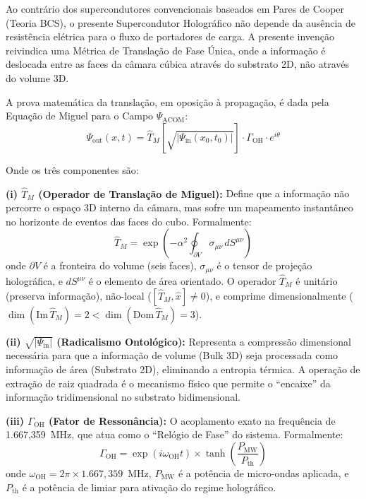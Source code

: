 \documentclass[12pt,a4paper]{article}
\newcommand{\alphaii}{\alpha^2}
\newcommand{\TM}{\hat{T}_M}
\newcommand{\GOH}{\Gamma_{\text{OH}}}
\begin{document}
Ao contrário dos supercondutores convencionais baseados em
Pares de Cooper (Teoria BCS), o presente Supercondutor
Holográfico não depende da ausência de resistência elétrica
para o fluxo de portadores de carga. A presente invenção
reivindica uma Métrica de Translação de Fase Única, onde a
informação é deslocada entre as faces da câmara cúbica através
do substrato 2D, não através do volume 3D.

A prova matemática da translação, em oposição à propagação, é
dada pela Equação de Miguel para o Campo $\Psi_{\text{ACOM}}$:
\begin{equation}
\Psi_{\text{out}}(x,t) = \TM\left[\sqrt{|\Psi_{\text{in}}
  (x_0,t_0)|}\right] \cdot \GOH \cdot e^{i\theta}
\label{eq:miguel}
\end{equation}

Onde os três componentes são:

\textbf{(i) $\TM$ (Operador de Translação de Miguel):} Define
que a informação não percorre o espaço 3D interno da câmara,
mas sofre um mapeamento instantâneo no horizonte de eventos
das faces do cubo. Formalmente:
\begin{equation}
\TM = \exp\left(-\alphaii \oint_{\partial V}
  \sigma_{\mu\nu}\, dS^{\mu\nu}\right)
\label{eq:operador_tm}
\end{equation}
onde $\partial V$ é a fronteira do volume (seis faces),
$\sigma_{\mu\nu}$ é o tensor de projeção holográfica, e
$dS^{\mu\nu}$ é o elemento de área orientado. O operador
$\TM$ é unitário (preserva informação), não-local
($[\TM, \hat{x}] \neq 0$), e comprime dimensionalmente
($\dim(\text{Im}\,\TM) = 2 < \dim(\text{Dom}\,\TM) = 3$).

\textbf{(ii) $\sqrt{|\Psi_{\text{in}}|}$ (Radicalismo
Ontológico):} Representa a compressão dimensional necessária
para que a informação de volume (Bulk 3D) seja processada como
informação de área (Substrato 2D), eliminando a entropia
térmica. A operação de extração de raiz quadrada é o mecanismo
físico que permite o ``encaixe'' da informação tridimensional
no substrato bidimensional.

\textbf{(iii) $\GOH$ (Fator de Ressonância):} O acoplamento
exato na frequência de 1.667,359~MHz, que atua como o
``Relógio de Fase'' do sistema. Formalmente:
\begin{equation}
\GOH = \exp(i\omega_{\text{OH}} t) \times
  \tanh\!\left(\frac{P_{\text{MW}}}{P_{\text{th}}}\right)
\label{eq:fator_oh}
\end{equation}
onde $\omega_{\text{OH}} = 2\pi \times 1.667{,}359$~MHz,
$P_{\text{MW}}$ é a potência de micro-ondas aplicada, e
$P_{\text{th}}$ é a potência de limiar para ativação do regime
holográfico.
\end{document}
